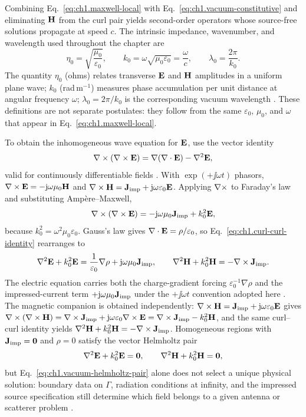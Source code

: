 Combining Eq.~\eqref{eq:ch1.maxwell-local} with Eq.~\eqref{eq:ch1.vacuum-constitutive} and eliminating $\mathbf{H}$ from the curl pair yields second-order operators whose source-free solutions propagate at speed $c$. The intrinsic impedance, wavenumber, and wavelength used throughout the chapter are
\begin{equation}
\label{eq:ch1.vacuum-impedance-wavenumber}
\eta_0=\sqrt{\frac{\mu_0}{\varepsilon_0}},\qquad
k_0=\omega\sqrt{\mu_0\varepsilon_0}=\frac{\omega}{c},\qquad
\lambda_0=\frac{2\pi}{k_0}.
\end{equation}
The quantity $\eta_0$ (ohms) relates transverse $\mathbf{E}$ and $\mathbf{H}$ amplitudes in a uniform plane wave; $k_0$ (rad\,m$^{-1}$) measures phase accumulation per unit distance at angular frequency $\omega$; $\lambda_0=2\pi/k_0$ is the corresponding vacuum wavelength \cite{stratton1941}. These definitions are not separate postulates: they follow from the same $\varepsilon_0$, $\mu_0$, and $\omega$ that appear in Eq.~\eqref{eq:ch1.maxwell-local}.

To obtain the inhomogeneous wave equation for $\mathbf{E}$, use the vector identity
\begin{equation}
\label{eq:ch1.curl-curl-identity}
\nabla\times(\nabla\times\mathbf{E})=\nabla(\nabla\cdot\mathbf{E})-\nabla^2\mathbf{E},
\end{equation}
valid for continuously differentiable fields \cite{stratton1941}. With $\exp(+\jj\omega t)$ phasors, $\nabla\times\mathbf{E}=-\mathrm{j}\omega\mu_0\mathbf{H}$ and $\nabla\times\mathbf{H}=\mathbf{J}_{\mathrm{imp}}+\mathrm{j}\omega\varepsilon_0\mathbf{E}$. Applying $\nabla\times$ to Faraday's law and substituting Amp\`ere--Maxwell,
\begin{equation}
\label{eq:ch1.wave-derivation-intermediate}
\nabla\times(\nabla\times\mathbf{E})=-\mathrm{j}\omega\mu_0\mathbf{J}_{\mathrm{imp}}+k_0^2\mathbf{E},
\end{equation}
because $k_0^2=\omega^2\mu_0\varepsilon_0$. Gauss's law gives $\nabla\cdot\mathbf{E}=\rho/\varepsilon_0$, so Eq.~\eqref{eq:ch1.curl-curl-identity} rearranges to
\begin{equation}
\label{eq:ch1.vacuum-wave-source-driven}
\nabla^2\mathbf{E}+k_0^2\mathbf{E}=\frac{1}{\varepsilon_0}\nabla\rho+\mathrm{j}\omega\mu_0\mathbf{J}_{\mathrm{imp}},\qquad
\nabla^2\mathbf{H}+k_0^2\mathbf{H}=-\nabla\times\mathbf{J}_{\mathrm{imp}}.
\end{equation}
The electric equation carries both the charge-gradient forcing $\varepsilon_0^{-1}\nabla\rho$ and the impressed-current term $+\mathrm{j}\omega\mu_0\mathbf{J}_{\mathrm{imp}}$ under the $+\jj\omega t$ convention adopted here \cite{jackson1999,stratton1941}. The magnetic companion is obtained independently: $\nabla\times\mathbf{H}=\mathbf{J}_{\mathrm{imp}}+\mathrm{j}\omega\varepsilon_0\mathbf{E}$ gives $\nabla\times(\nabla\times\mathbf{H})=\nabla\times\mathbf{J}_{\mathrm{imp}}+\mathrm{j}\omega\varepsilon_0\nabla\times\mathbf{E}=\nabla\times\mathbf{J}_{\mathrm{imp}}-k_0^2\mathbf{H}$, and the same curl--curl identity yields $\nabla^2\mathbf{H}+k_0^2\mathbf{H}=-\nabla\times\mathbf{J}_{\mathrm{imp}}$. Homogeneous regions with $\mathbf{J}_{\mathrm{imp}}=\mathbf{0}$ and $\rho=0$ satisfy the vector Helmholtz pair
\begin{equation}
\label{eq:ch1.vacuum-helmholtz-pair}
\nabla^2\mathbf{E}+k_0^2\mathbf{E}=\mathbf{0},\qquad
\nabla^2\mathbf{H}+k_0^2\mathbf{H}=\mathbf{0},
\end{equation}
but Eq.~\eqref{eq:ch1.vacuum-helmholtz-pair} alone does not select a unique physical solution: boundary data on $\Gamma$, radiation conditions at infinity, and the impressed source specification still determine which field belongs to a given antenna or scatterer problem \cite{stratton1941}.

